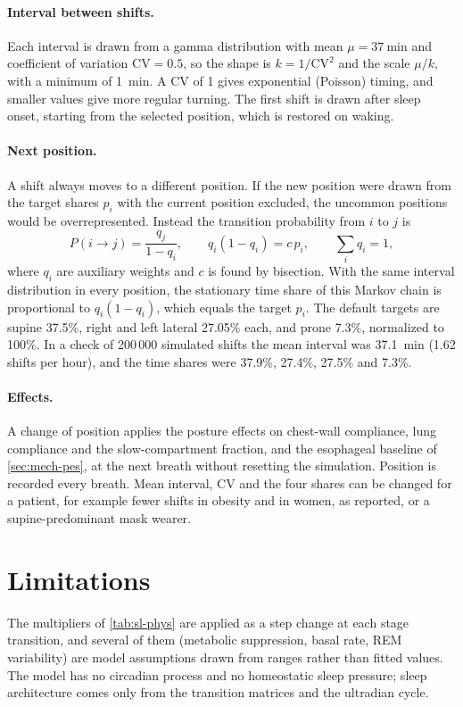 \paragraph{Interval between shifts.} Each interval is drawn from a gamma distribution with mean $\mu=\SI{37}{\minute}$ and coefficient of variation $\mathrm{CV}=0.5$, so the shape is $k=1/\mathrm{CV}^2$ and the scale $\mu/k$, with a minimum of \SI{1}{\minute}. A CV of 1 gives exponential (Poisson) timing, and smaller values give more regular turning. The first shift is drawn after sleep onset, starting from the selected position, which is restored on waking.

\paragraph{Next position.} A shift always moves to a different position. If the new position were drawn from the target shares $p_i$ with the current position excluded, the uncommon positions would be overrepresented. Instead the transition probability from $i$ to $j$ is
\begin{equation}
P(i\to j)=\frac{q_j}{1-q_i},\qquad q_i(1-q_i)=c\,p_i,\qquad \sum_i q_i=1,
\label{eq:sl-pos}
\end{equation}
where $q_i$ are auxiliary weights and $c$ is found by bisection. With the same interval distribution in every position, the stationary time share of this Markov chain is proportional to $q_i(1-q_i)$, which equals the target $p_i$. The default targets are supine 37.5\%, right and left lateral 27.05\% each, and prone 7.3\%, normalized to 100\%. In a check of 200\,000 simulated shifts the mean interval was \SI{37.1}{\minute} (1.62 shifts per hour), and the time shares were 37.9\%, 27.4\%, 27.5\% and 7.3\%.

\paragraph{Effects.} A change of position applies the posture effects on chest-wall compliance, lung compliance and the slow-compartment fraction, and the esophageal baseline of \cref{sec:mech-pes}, at the next breath without resetting the simulation. Position is recorded every breath. Mean interval, CV and the four shares can be changed for a patient, for example fewer shifts in obesity and in women, as \citet{skarpsno2017} reported, or a supine-predominant mask wearer.

\section{Limitations}
The multipliers of \cref{tab:sl-phys} are applied as a step change at each stage transition, and several of them (metabolic suppression, basal rate, REM variability) are model assumptions drawn from ranges rather than fitted values. The model has no circadian process and no homeostatic sleep pressure; sleep architecture comes only from the transition matrices and the ultradian cycle.

